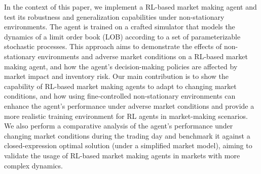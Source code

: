 In the context of this paper, we implement a RL-based market making agent and test its robustness and generalization capabilities under non-stationary environments.
The agent is trained on a crafted simulator that models the dynamics of a limit order book (LOB) according to a set of parameterizable stochastic processes.
This approach aims to demonstrate the effects of non-stationary environments and adverse market conditions on
a RL-based market making agent, and how the agent's decision-making policies are affected by market impact and inventory risk.
Our main contribution is to show the capability of RL-based market making agents to adapt to changing market conditions,
and how using fine-controlled non-stationary environments can enhance the agent's performance under adverse market conditions
and provide a more realistic training environment for RL agents in market-making scenarios.
We also perform a comparative analysis of the agent's performance under changing market conditions during the
trading day and benchmark it against a closed-expression optimal solution (under a simplified market model),
aiming to validate the usage of RL-based market making agents in markets with more complex dynamics.

